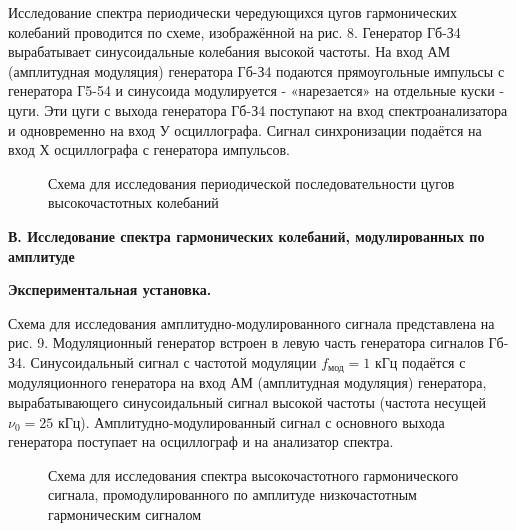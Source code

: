 \documentclass[14pt]{article}
\begin{document}
Исследование спектра периодически чередующихся цугов гармонических колебаний проводится по схеме, изображённой на рис. 8. Генератор Гб-З4 вырабатывает синусоидальные колебания высокой частоты. На вход АМ (амплитудная модуляция) генератора Гб-З4 подаются прямоугольные импульсы с генератора Г5-54 и синусоида модулируется - «нарезается» на отдельные куски - цуги. Эти цуги с выхода генератора Гб-З4 поступают на вход спектроанализатора и одновременно на вход У осциллографа. Сигнал синхронизации подаётся на вход Х осциллографа с генератора импульсов.

\begin{figure}[h!]
	\caption{Схема для исследования периодической последовательности цугов высокочастотных колебаний}
	\label{fig:image}
\end{figure}


\newpage
\textbf{В. Исследование спектра гармонических колебаний, модулированных по амплитуде}

\textbf{Экспериментальная установка.} 

Схема для исследования амплитудно-модулированного сигнала представлена на рис. 9. Модуляционный генератор встроен в левую часть генератора сигналов Гб-З4. Синусоидальный сигнал с частотой модуляции $f_{\text{мод}} = 1$ кГц подаётся с модуляционного генератора на вход АМ (амплитудная модуляция) генератора, вырабатывающего синусоидальный сигнал высокой частоты (частота несущей $\nu_0 = 25$ кГц). Амплитудно-модулированный сигнал с основного выхода генератора поступает на осциллограф и на анализатор спектра.

\begin{figure}[h!]
	\caption{Схема для исследования спектра высокочастотного гармонического сигнала, промодулированного по амплитуде низкочастотным гармоническим сигналом}
	\label{fig:image}
\end{figure}
\end{document}
